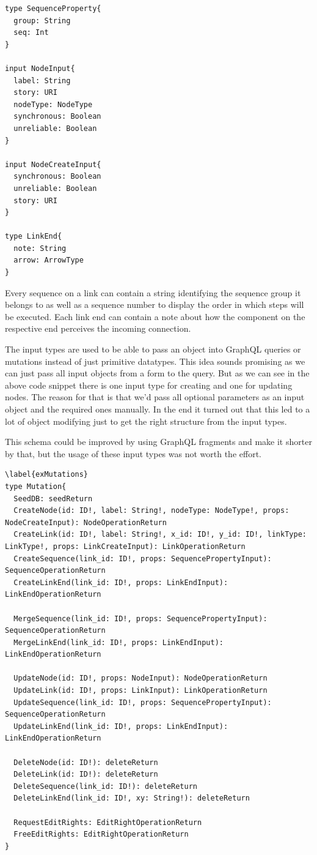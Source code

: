 \begin{lstlisting}
type SequenceProperty{
  group: String
  seq: Int
}

input NodeInput{
  label: String
  story: URI
  nodeType: NodeType
  synchronous: Boolean
  unreliable: Boolean
}

input NodeCreateInput{
  synchronous: Boolean
  unreliable: Boolean
  story: URI
}

type LinkEnd{
  note: String
  arrow: ArrowType
}
\end{lstlisting}
Every sequence on a link can contain a string identifying the sequence group it belongs to as well as a sequence number to display the order in which steps will be executed. Each link end can contain a note about how the component on the respective end perceives the incoming connection.

The input types are used to be able to pass an object into GraphQL queries or mutations instead of just primitive datatypes. This idea sounds promising as we can just pass all input objects from a form to the query. But as we can see in the above code snippet there is one input type for creating and one for updating nodes. The reason for that is that we'd pass all optional parameters as an input object and the required ones manually. In the end it turned out that this led to a lot of object modifying just to get the right structure from the input types.

This schema could be improved by using GraphQL fragments and make it shorter by that, but the usage of these input types was not worth the effort. 

\begin{lstlisting}[caption={Mutation Type Definition},label={mutations}]
\label{exMutations}
type Mutation{
  SeedDB: seedReturn
  CreateNode(id: ID!, label: String!, nodeType: NodeType!, props: NodeCreateInput): NodeOperationReturn
  CreateLink(id: ID!, label: String!, x_id: ID!, y_id: ID!, linkType: LinkType!, props: LinkCreateInput): LinkOperationReturn
  CreateSequence(link_id: ID!, props: SequencePropertyInput): SequenceOperationReturn
  CreateLinkEnd(link_id: ID!, props: LinkEndInput): LinkEndOperationReturn

  MergeSequence(link_id: ID!, props: SequencePropertyInput): SequenceOperationReturn
  MergeLinkEnd(link_id: ID!, props: LinkEndInput): LinkEndOperationReturn

  UpdateNode(id: ID!, props: NodeInput): NodeOperationReturn
  UpdateLink(id: ID!, props: LinkInput): LinkOperationReturn
  UpdateSequence(link_id: ID!, props: SequencePropertyInput): SequenceOperationReturn
  UpdateLinkEnd(link_id: ID!, props: LinkEndInput): LinkEndOperationReturn

  DeleteNode(id: ID!): deleteReturn
  DeleteLink(id: ID!): deleteReturn
  DeleteSequence(link_id: ID!): deleteReturn
  DeleteLinkEnd(link_id: ID!, xy: String!): deleteReturn

  RequestEditRights: EditRightOperationReturn
  FreeEditRights: EditRightOperationReturn
}
\end{lstlisting}

